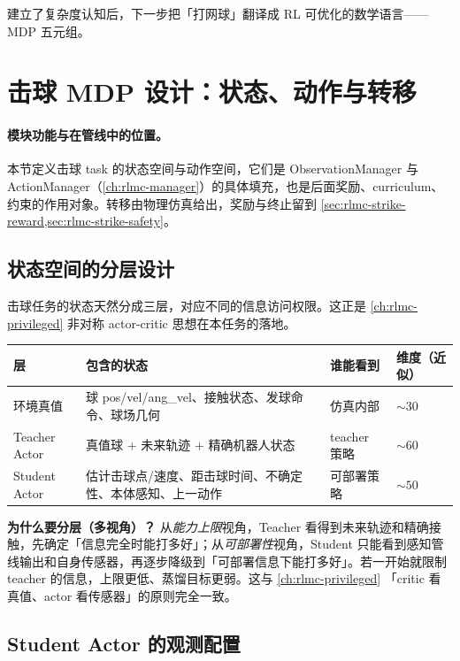 \noindent{}建立了复杂度认知后，下一步把「打网球」翻译成 RL 可优化的数学语言——MDP 五元组。

\section{击球 MDP 设计：状态、动作与转移}
\label{sec:rlmc-strike-mdp}

\paragraph{模块功能与在管线中的位置。}本节定义击球 task 的状态空间与动作空间，它们是 ObservationManager 与 ActionManager（\cref{ch:rlmc-manager}）的具体填充，也是后面奖励、curriculum、约束的作用对象。转移由物理仿真给出，奖励与终止留到 \cref{sec:rlmc-strike-reward,sec:rlmc-strike-safety}。

\subsection{状态空间的分层设计}

击球任务的状态天然分成三层，对应不同的信息访问权限。这正是 \cref{ch:rlmc-privileged} 非对称 actor-critic 思想在本任务的落地。

\begin{center}
\small
\begin{tabular}{@{}llll@{}}
\toprule
层 & 包含的状态 & 谁能看到 & 维度（近似） \\
\midrule
环境真值 & 球 pos/vel/ang\_vel、接触状态、发球命令、球场几何 & 仿真内部 & $\sim 30$ \\
Teacher Actor & 真值球 $+$ 未来轨迹 $+$ 精确机器人状态 & teacher 策略 & $\sim 60$ \\
Student Actor & 估计击球点/速度、距击球时间、不确定性、本体感知、上一动作 & 可部署策略 & $\sim 50$ \\
\bottomrule
\end{tabular}
\end{center}

\textbf{为什么要分层（多视角）？} 从\emph{能力上限}视角，Teacher 看得到未来轨迹和精确接触，先确定「信息完全时能打多好」；从\emph{可部署性}视角，Student 只能看到感知管线输出和自身传感器，再逐步降级到「可部署信息下能打多好」。若一开始就限制 teacher 的信息，上限更低、蒸馏目标更弱。这与 \cref{ch:rlmc-privileged} 「critic 看真值、actor 看传感器」的原则完全一致。

\subsection{Student Actor 的观测配置}


